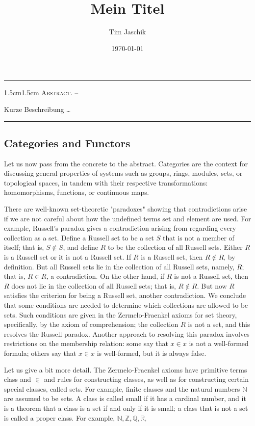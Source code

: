 \documentclass[10pt, letterpaper]{article}
\title{Mein Titel}
\author{Tim Jaschik}
\date{\today}
\renewenvironment{abstract}
  {
    \begin{adjustwidth}{1.5cm}{1.5cm}
    \small
    \textsc{Abstract. –}%
  }
  {
    \end{adjustwidth}
  }
\begin{document}
\maketitle
\rule{\textwidth}{0.5pt}
\begin{abstract}
Kurze Beschreibung …
\end{abstract}
\rule{\textwidth}{0.5pt}
\vspace{0.5cm}

\tableofcontents

\pagebreak




\subsection*{Categories and Functors}
Let us now pass from the concrete to the abstract. Categories are the context for discussing general properties of systems such as groups, rings, modules, sets, or topological spaces, in tandem with their respective transformations: homomorphisms, functions, or continuous maps.

There are well-known set-theoretic "paradoxes" showing that contradictions arise if we are not careful about how the undefined terms set and element are used. For example, Russell's paradox gives a contradiction arising from regarding every collection as a set. Define a Russell set to be a set $S$ that is not a member of itself; that is, $S \notin S$, and define $R$ to be the collection of all Russell sets. Either $R$ is a Russell set or it is not a Russell set. If $R$ is a Russell set, then $R \notin R$, by definition. But all Russell sets lie in the collection of all Russell sets, namely, $R$; that is, $R \in R$, a contradiction. On the other hand, if $R$ is not a Russell set, then $R$ does not lie in the collection of all Russell sets; that is, $R \notin R$. But now $R$ satisfies the criterion for being a Russell set, another contradiction. We conclude that some conditions are needed to determine which collections are allowed to be sets. Such conditions are given in the Zermelo-Fraenkel axioms for set theory, specifically, by the axiom of comprehension; the collection $R$ is not a set, and this resolves the Russell paradox. Another approach to resolving this paradox involves restrictions on the membership relation: some say that $x \in x$ is not a well-formed formula; others say that $x \in x$ is well-formed, but it is always false.

Let us give a bit more detail. The Zermelo-Fraenkel axioms have primitive terms class and $\in$ and rules for constructing classes, as well as for constructing certain special classes, called sets. For example, finite classes and the natural numbers $\mathbb{N}$ are assumed to be sets. A class is called small if it has a cardinal number, and it is a theorem that a class is a set if and only if it is small; a class that is not a set is called a proper class. For example, $\mathbb{N}, \mathbb{Z}, \mathbb{Q}, \mathbb{R}$,
\end{document}
